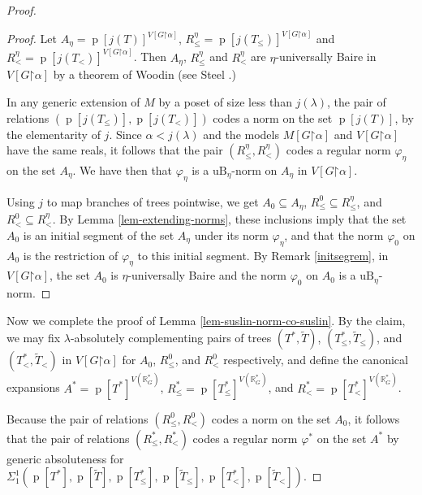\documentclass[fleqn, 11pt]{amsart}
\theoremstyle{plain}
\theoremstyle{definition}
\theoremstyle{remark}
\newcommand{\uB}{\mathrm{uB}}
\newcommand{\restrict}{\mathord{\restriction}}
\DeclareMathOperator{\p}{p}
\begin{document}
\begin{proof}
\begin{proof}
  
  Let $A_\eta = \p[j(T)]^{V[G \restrict \alpha]}$, $R_{\le}^{\eta} = \p[j(T_\le)]^{V[G \restrict \alpha]}$ 
  and $R_{<}^{\eta} = \p[j(T_<)]^{V[G \restrict \alpha]}$.
  Then $A_\eta$, $R_{\le}^{\eta}$ and $R_{<}^{\eta}$ are $\eta$-universally Baire in $V[G \restrict \alpha]$ by a theorem of Woodin (see Steel \cite[Theorem 4.5]{SteDMT}.)
  
  In any generic extension of $M$ by a poset of size less than $j(\lambda)$, the pair of relations $(\p[j(T_\le)], \p[j(T_<)])$ codes a norm on the set $\p[j(T)]$, by the elementarity of $j$.
  Since $\alpha < j(\lambda)$ and the models $M[G \restrict \alpha]$ and $V[G \restrict \alpha]$ have the same reals, it follows that the pair $(R_{\le}^{\eta}, R_{<}^{\eta})$ codes a regular norm $\varphi_\eta$ on the set $A_\eta$.
  We have then that $\varphi_\eta$ is a $\uB_{\eta}$-norm on $A_\eta$ in $V[G \restrict \alpha]$.
 
  Using $j$ to map branches of trees pointwise, we get $A_0 \subseteq A_\eta$, $R_{\le}^{0} \subseteq R_{\le}^{\eta}$, and $R_{<}^{0} \subseteq R_{<}^{\eta}$.
  By Lemma \ref{lem-extending-norms},
  these inclusions imply that the set $A_0$ is an initial segment of the set $A_\eta$ under its norm $\varphi_\eta$, and that the norm $\varphi_0$ on $A_0$ is the restriction of $\varphi_\eta$ to this initial segment.
  By Remark \ref{initsegrem}, in $V[G \restrict \alpha]$, the set $A_0$ is $\eta$-universally Baire and the norm $\varphi_0$ on $A_0$ is a $\uB_{\eta}$-norm. \end{proof}
  
 
 
 Now we complete the proof of Lemma \ref{lem-suslin-norm-co-suslin}. By the claim, we may fix $\lambda$-absolutely complementing pairs of trees $(T^*,\tilde{T})$, $(T_\le^*, \tilde{T}_\le)$, and $(T_<^*,\tilde{T}_<)$ in $V[G \restrict \alpha]$ for $A_0$, $R_{\le}^{0}$, and $R_{<}^{0}$ respectively, and
 define the canonical expansions $A^* = \p[T^*]^{V(\mathbb{R}^*_G)}$, $R_\le^* = \p[T_\le^*]^{V(\mathbb{R}^*_G)}$, and $R_<^* =  \p[T_<^*]^{V(\mathbb{R}^*_G)}$.
 
 Because the pair of relations $(R_{\le}^{0}, R_{<}^{0})$ codes a norm on the set $A_0$,
 it follows that the pair of relations $(R_\le^*, R_<^*)$ codes a regular norm $\varphi^*$ on the set $A^*$
 by generic absoluteness for 
 $\Sigma^1_1(\p[T^*], \p[\tilde{T}], \p[T_\le^*], \p[\tilde{T}_\le], \p[T_<^*], \p[\tilde{T}_<])$.
 

\end{proof}
\end{document}
